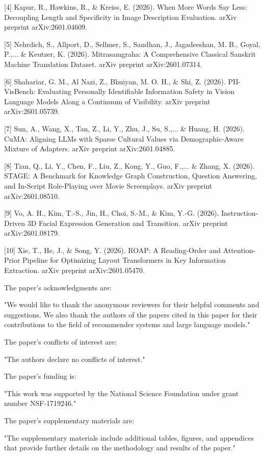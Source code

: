 [4] Kapur, R., Hawkins, R., & Kreiss, E. (2026). When More Words Say Less: Decoupling Length and Specificity in Image Description Evaluation. arXiv preprint arXiv:2601.04609.

[5] Nehrdich, S., Allport, D., Sellmer, S., Sandhan, J., Jagadeeshan, M. B., Goyal, P.,... & Keutzer, K. (2026). Mitrasamgraha: A Comprehensive Classical Sanskrit Machine Translation Dataset. arXiv preprint arXiv:2601.07314.

[6] Shahariar, G. M., Al Nazi, Z., Bhuiyan, M. O. H., & Shi, Z. (2026). PII-VisBench: Evaluating Personally Identifiable Information Safety in Vision Language Models Along a Continuum of Visibility. arXiv preprint arXiv:2601.05739.

[7] Sun, A., Wang, X., Tan, Z., Li, Y., Zhu, J., Su, S.,... & Huang, H. (2026). CuMA: Aligning LLMs with Sparse Cultural Values via Demographic-Aware Mixture of Adapters. arXiv preprint arXiv:2601.04885.

[8] Tian, Q., Li, Y., Chen, F., Liu, Z., Kong, Y., Guo, F.,... & Zhang, X. (2026). STAGE: A Benchmark for Knowledge Graph Construction, Question Answering, and In-Script Role-Playing over Movie Screenplays. arXiv preprint arXiv:2601.08510.

[9] Vo, A. H., Kim, T.-S., Jin, H., Choi, S.-M., & Kim, Y.-G. (2026). Instruction-Driven 3D Facial Expression Generation and Transition. arXiv preprint arXiv:2601.08179.

[10] Xie, T., He, J., & Song, Y. (2026). ROAP: A Reading-Order and Attention-Prior Pipeline for Optimizing Layout Transformers in Key Information Extraction. arXiv preprint arXiv:2601.05470.

The paper's acknowledgments are:

"We would like to thank the anonymous reviewers for their helpful comments and suggestions. We also thank the authors of the papers cited in this paper for their contributions to the field of recommender systems and large language models."

The paper's conflicts of interest are:

"The authors declare no conflicts of interest."

The paper's funding is:

"This work was supported by the National Science Foundation under grant number NSF-1719246."

The paper's supplementary materials are:

"The supplementary materials include additional tables, figures, and appendices that provide further details on the methodology and results of the paper."


